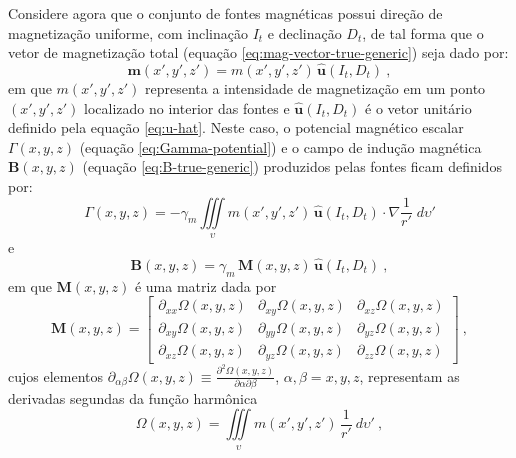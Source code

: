 Considere agora que o conjunto de fontes magnéticas possui direção de magnetização 
uniforme, com inclinação $I_{t}$ e declinação $D_{t}$, de tal forma que o vetor 
de magnetização total (equação \ref{eq:mag-vector-true-generic}) seja dado por:
\begin{equation}
\mathbf{m}(x', y', z') = m(x', y', z') \, \hat{\mathbf{u}}(I_{t}, D_{t}) \: ,
\label{eq:mag-vector-true-uniform}
\end{equation}
em que $m(x', y', z')$ representa a intensidade de magnetização em um ponto $(x', y', z')$ 
localizado no interior das fontes e $\hat{\mathbf{u}}(I_{t}, D_{t})$ é o vetor unitário 
definido pela equação \ref{eq:u-hat}.
Neste caso, o potencial magnético escalar $\Gamma(x, y, z)$ (equação \ref{eq:Gamma-potential}) 
e o campo de indução magnética $\mathbf{B}(x, y, z)$ (equação \ref{eq:B-true-generic}) produzidos 
pelas fontes ficam definidos por:
\begin{equation}
\Gamma(x, y, z) = - \gamma_{m} \iiint\limits_{\upsilon} 
m(x', y', z') \, \hat{\mathbf{u}}(I_{t}, D_{t}) \cdot \nabla\frac{1}{r'} 
\; d\upsilon'
\label{eq:Gamma-potential-mag-uniform}
\end{equation}
e
\begin{equation}
\mathbf{B}(x, y, z) = \gamma_{m} \, \mathbf{M}(x, y, z) \, \hat{\mathbf{u}}(I_{t}, D_{t}) \: ,
\label{eq:B-true-mag-uniform}
\end{equation}
em que $\mathbf{M}(x, y, z)$ é uma matriz dada por
\begin{equation}
	\mathbf{M}(x, y, z) = \begin{bmatrix}
		\partial_{xx} \Omega(x, y, z) & 
		\partial_{xy} \Omega(x, y, z) &
		\partial_{xz} \Omega(x, y, z) \\
		\partial_{xy} \Omega(x, y, z) & 
		\partial_{yy} \Omega(x, y, z) &
		\partial_{yz} \Omega(x, y, z) \\
		\partial_{xz} \Omega(x, y, z) & 
		\partial_{yz} \Omega(x, y, z) &
		\partial_{zz} \Omega(x, y, z)
	\end{bmatrix} \: ,
	\label{eq:M-matrix}
\end{equation}
cujos elementos $\partial_{\alpha\beta} \Omega(x, y, z) \equiv 
\frac{\partial^{2} \Omega(x, y, z)}{\partial \alpha \partial \beta}$, 
$\alpha, \beta = x, y, z$, representam as derivadas segundas da função harmônica 
\begin{equation}
\Omega(x, y, z) = \iiint\limits_{\upsilon} 
m(x', y', z') \, \frac{1}{r'} \: d\upsilon' \: ,
\label{eq:Omega-potential}
\end{equation}
